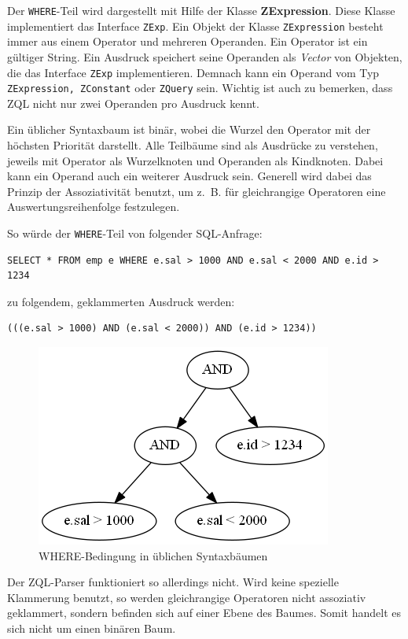 Der \verb|WHERE|-Teil wird dargestellt mit Hilfe der Klasse \textbf{ZExpression}. Diese Klasse implementiert das Interface \verb|ZExp|. Ein Objekt der Klasse \verb|ZExpression| besteht immer aus einem Operator und mehreren Operanden. Ein Operator ist ein gültiger String. Ein Ausdruck speichert seine Operanden als \textit{Vector} von Objekten, die das Interface \verb|ZExp| implementieren. Demnach kann ein Operand vom Typ \verb|ZExpression, ZConstant| oder \verb|ZQuery| sein.
Wichtig ist auch zu bemerken, dass ZQL nicht nur zwei Operanden pro Ausdruck kennt. 

Ein üblicher Syntaxbaum ist binär, wobei die Wurzel den Operator mit der höchsten Priorität darstellt. Alle Teilbäume sind als Ausdrücke zu verstehen, jeweils mit Operator als Wurzelknoten und Operanden als Kindknoten. Dabei kann ein Operand auch ein weiterer Ausdruck sein. Generell wird dabei das Prinzip der Assoziativität benutzt, um \mbox{z. B.} für gleichrangige Operatoren eine Auswertungsreihenfolge festzulegen.

So würde der \verb|WHERE|-Teil von folgender SQL-Anfrage:
\begin{verbatim}
SELECT * FROM emp e WHERE e.sal > 1000 AND e.sal < 2000 AND e.id > 1234
\end{verbatim}

zu folgendem, geklammerten Ausdruck werden:
\begin{verbatim}
(((e.sal > 1000) AND (e.sal < 2000)) AND (e.id > 1234))
\end{verbatim}

\begin{figure}[h]
\label{baum1}
\includegraphics[scale=0.7]{Bilder/where_syntax.png}
\caption{WHERE-Bedingung in üblichen Syntaxbäumen}
\end{figure}

Der ZQL-Parser funktioniert so allerdings nicht. Wird keine spezielle Klammerung benutzt, so werden gleichrangige Operatoren nicht assoziativ geklammert, sondern befinden sich auf einer Ebene des Baumes. Somit handelt es sich nicht um einen binären Baum. 

